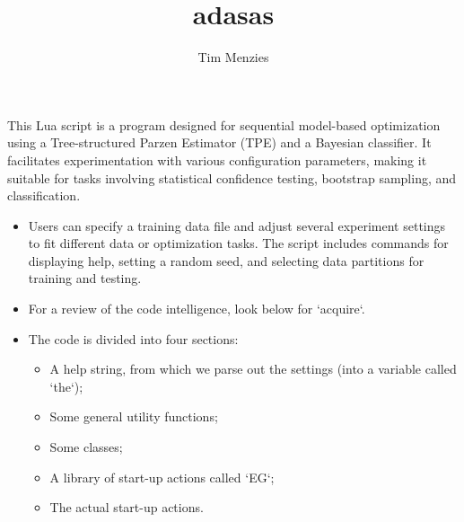 \documentclass[10pt,portrait]{book}
\title{adasas}
\author{Tim Menzies}
\begin{document}
\maketitle
\small

\twocolumn
 This Lua script is a program designed for sequential
   model-based optimization using a Tree-structured Parzen Estimator
   (TPE) and a Bayesian classifier. It facilitates experimentation
   with various configuration parameters, making it suitable for tasks
   involving statistical confidence testing, bootstrap sampling, and
   classification.
   \begin{itemize}
   \item
  Users can specify a training data file and adjust several experiment
   settings to fit different data or optimization tasks. The script
   includes commands for displaying help, setting a random seed, and
   selecting data partitions for training and testing. 
   \item
  For a review of the code intelligence, look below for `acquire`.
  \item
  The code is divided into four sections:
   \begin{itemize}
   \item
      A help string, from which we parse out the settings (into a variable called `the`);
     \item Some general utility functions;
     \item Some classes;
     \item A library of start-up actions called `EG`;
     \item The actual start-up actions.
   \end{itemize}
   \end{itemize}

\begin{figure}
\inputminted{lua}{luas/Bayes.lua}
\end{figure}

\begin{figure}
\inputminted{lua}{luas/Data.lua}
\end{figure}
\begin{figure}
\inputminted{lua}{luas/Dist.lua}
\end{figure}
\begin{figure}
\inputminted{lua}{luas/EG.lua}
\end{figure}
\begin{figure}
\inputminted{lua}{luas/Start-up.lua}
\end{figure}
\begin{figure}
\inputminted{lua}{luas/Starting.lua}
\end{figure}
\begin{figure}
\inputminted{lua}{luas/Stats.lua}
\end{figure}
\begin{figure}
\inputminted{lua}{luas/Utilities.lua}
\end{figure}
\end{document}
